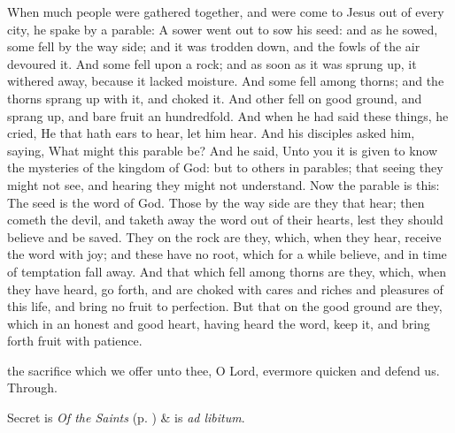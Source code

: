  When much people were gathered together, and were come to Jesus out of every city, he spake by a parable: A sower went out to sow his seed: and as he sowed, some fell by the way side; and it was trodden down, and the fowls of the air devoured it. And some fell upon a rock; and as soon as it was sprung up, it withered away, because it lacked moisture. And some fell among thorns; and the thorns sprang up with it, and choked it. And other fell on good ground, and sprang up, and bare fruit an hundredfold. And when he had said these things, he cried, He that hath ears to hear, let him hear. And his disciples asked him, saying, What might this parable be? And he said, Unto you it is given to know the mysteries of the kingdom of God: but to others in parables; that seeing they might not see, and hearing they might not understand. Now the parable is this: The seed is the word of God. Those by the way side are they that hear; then cometh the devil, and taketh away the word out of their hearts, lest they should believe and be saved. They on the rock are they, which, when they hear, receive the word with joy; and these have no root, which for a while believe, and in time of temptation fall away. And that which fell among thorns are they, which, when they have heard, go forth, and are choked with cares and riches and pleasures of this life, and bring no fruit to perfection. But that on the good ground are they, which in an honest and good heart, having heard the word, keep it, and bring forth fruit with patience.

\secret
{} the sacrifice which we offer unto thee, O Lord, evermore quicken and defend us. Through.
\begin{rubric}
     Secret is \emph{Of the Saints} (p. \pageref{SPSaints}) \&  is \emph{ad libitum}.
\end{rubric}


